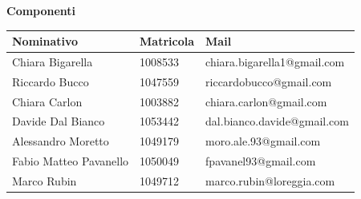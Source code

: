 	\textbf{Componenti}
	\begin{center}
	\begin{tabular}{ | p{4cm} | p{2.5cm} | p{5cm} |}
	\hline
     Nominativo & Matricola & Mail \\ \hline
     Chiara Bigarella & 1008533 & chiara.bigarella1@gmail.com \\ \hline
     Riccardo Bucco & 1047559 & riccardobucco@gmail.com \\ \hline
     Chiara Carlon & 1003882 & chiara.carlon@gmail.com \\ \hline
     Davide Dal Bianco & 1053442 & dal.bianco.davide@gmail.com \\ \hline
     Alessandro Moretto & 1049179 & moro.ale.93@gmail.com \\ \hline
     Fabio Matteo Pavanello & 1050049 & fpavanel93@gmail.com \\ \hline
     Marco Rubin & 1049712 & marco.rubin@loreggia.com \\ \hline
     \end{tabular}
	\end{center}